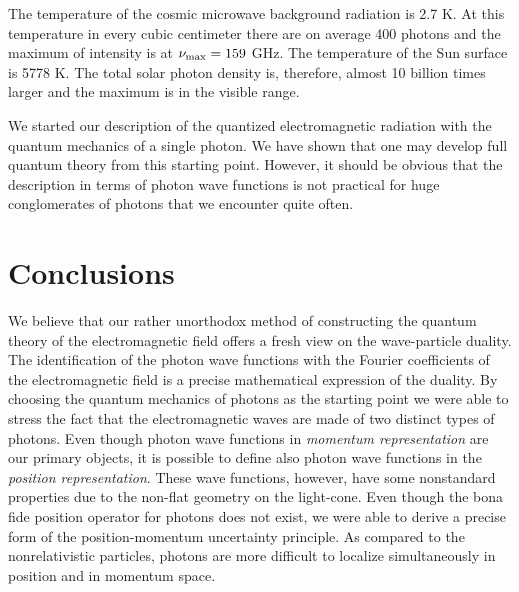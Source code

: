 \documentclass[onecolumn,aps,pra,12pt]{revtex4-1}
\begin{document}
The temperature of the cosmic microwave background radiation is 2.7 K. At this temperature in every cubic centimeter there are on average 400 photons and the maximum of intensity is at $\nu_{\rm max}=159$ GHz. The temperature of the Sun surface is 5778 K. The total solar photon density is, therefore, almost 10 billion times larger and the maximum is in the visible range.

We started our description of the quantized electromagnetic radiation with the quantum mechanics of a single photon. We have shown that one may develop full quantum theory from this starting point. However, it should be obvious that the description in terms of photon wave functions is not practical for huge conglomerates of photons that we encounter quite often.

\section{Conclusions}

We believe that our rather unorthodox method of constructing the quantum theory of the electromagnetic field offers a fresh view on the wave-particle duality. The identification of the photon wave functions with the Fourier coefficients of the electromagnetic field is a precise mathematical expression of the duality. By choosing the quantum mechanics of photons as the starting point we were able to stress the fact that the electromagnetic waves are made of two distinct types of photons. Even though photon wave functions in {\em momentum representation} are our primary objects, it is possible to define also photon wave functions in the {\em position representation}. These wave functions, however, have some nonstandard properties due to the non-flat geometry on the light-cone. Even though the bona fide position operator for photons does not exist, we were able to derive a precise form of the position-momentum uncertainty principle. As compared to the nonrelativistic particles, photons are more difficult to localize simultaneously in position and in momentum space.
\end{document}
